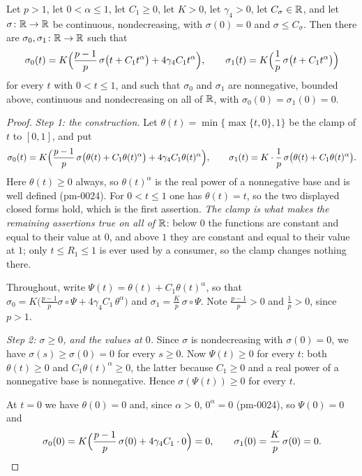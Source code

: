 \begin{lemma}
Let $p>1$, let $0<\alpha\le1$, let $C_1\ge0$, let $K>0$, let $\gamma_4>0$, let
$C_\sigma\in\mathbb{R}$, and let $\sigma\colon\mathbb{R}\to\mathbb{R}$ be continuous, nondecreasing,
with $\sigma(0)=0$ and $\sigma\le C_\sigma$.  Then there are
$\sigma_0,\sigma_1\colon\mathbb{R}\to\mathbb{R}$ such that
\[
\sigma_0(t)=K\Bigl(\frac{p-1}p\,\sigma\bigl(t+C_1t^{\alpha}\bigr)
+4\gamma_4C_1t^{\alpha}\Bigr),
\qquad
\sigma_1(t)=K\Bigl(\frac1p\,\sigma\bigl(t+C_1t^{\alpha}\bigr)\Bigr)
\]
for every $t$ with $0<t\le1$, and such that $\sigma_0$ and $\sigma_1$ are
nonnegative, bounded above, continuous and nondecreasing on all of $\mathbb{R}$, with
$\sigma_0(0)=\sigma_1(0)=0$.
\end{lemma}
\begin{proof}
\emph{Step 1: the construction.}  Let $\theta(t)=\min\{\max\{t,0\},1\}$ be the
clamp of $t$ to $[0,1]$, and put
\[
\sigma_0(t)=K\Bigl(\frac{p-1}p\,\sigma\bigl(\theta(t)+C_1\theta(t)^{\alpha}\bigr)
+4\gamma_4C_1\theta(t)^{\alpha}\Bigr),
\qquad
\sigma_1(t)=K\cdot\frac1p\,\sigma\bigl(\theta(t)+C_1\theta(t)^{\alpha}\bigr).
\]
Here $\theta(t)\ge0$ always, so $\theta(t)^{\alpha}$ is the real power of a
nonnegative base and is well defined (pm-0024).  For $0<t\le1$ one has
$\theta(t)=t$, so the two displayed closed forms hold, which is the first
assertion.  \emph{The clamp is what makes the remaining assertions true on all
of $\mathbb{R}$}: below $0$ the functions are constant and equal to their value at $0$,
and above $1$ they are constant and equal to their value at $1$; only
$t\le R_1\le1$ is ever used by a consumer, so the clamp changes nothing there.

Throughout, write $\Psi(t)=\theta(t)+C_1\theta(t)^{\alpha}$, so that
$\sigma_0=K\bigl(\frac{p-1}p\sigma\circ\Psi+4\gamma_4C_1\,\theta^{\alpha}\bigr)$
and $\sigma_1=\frac Kp\,\sigma\circ\Psi$.  Note $\frac{p-1}p>0$ and
$\frac1p>0$, since $p>1$.

\emph{Step 2: $\sigma\ge0$, and the values at $0$.}  Since $\sigma$ is
nondecreasing with $\sigma(0)=0$, we have $\sigma(s)\ge\sigma(0)=0$ for every
$s\ge0$.  Now $\Psi(t)\ge0$ for every $t$: both $\theta(t)\ge0$ and
$C_1\theta(t)^{\alpha}\ge0$, the latter because $C_1\ge0$ and a real power of a
nonnegative base is nonnegative.  Hence $\sigma(\Psi(t))\ge0$ for every $t$.

At $t=0$ we have $\theta(0)=0$ and, since $\alpha>0$, $0^{\alpha}=0$ (pm-0024),
so $\Psi(0)=0$ and
\[
\sigma_0(0)=K\Bigl(\frac{p-1}p\,\sigma(0)+4\gamma_4C_1\cdot0\Bigr)=0,
\qquad
\sigma_1(0)=\frac Kp\,\sigma(0)=0 .
\]


\end{proof}
